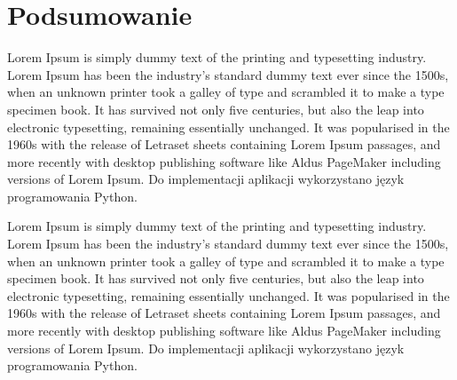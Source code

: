 \documentclass{article}
\begin{document}
\FloatBarrier
\section{Podsumowanie}

Lorem Ipsum is simply dummy text of the printing and typesetting industry. Lorem Ipsum has been the industry's standard dummy text ever since the 1500s, when an unknown printer took a galley of type and scrambled it to make a type specimen book. It has survived not only five centuries, but also the leap into electronic typesetting, remaining essentially unchanged. It was popularised in the 1960s with the release of Letraset sheets containing Lorem Ipsum passages, and more recently with desktop publishing software like Aldus PageMaker including versions of Lorem Ipsum. Do implementacji aplikacji wykorzystano język programowania Python.

Lorem Ipsum is simply dummy text of the printing and typesetting industry. Lorem Ipsum has been the industry's standard dummy text ever since the 1500s, when an unknown printer took a galley of type and scrambled it to make a type specimen book. It has survived not only five centuries, but also the leap into electronic typesetting, remaining essentially unchanged. It was popularised in the 1960s with the release of Letraset sheets containing Lorem Ipsum passages, and more recently with desktop publishing software like Aldus PageMaker including versions of Lorem Ipsum. Do implementacji aplikacji wykorzystano język programowania Python.

  
\end{document}
